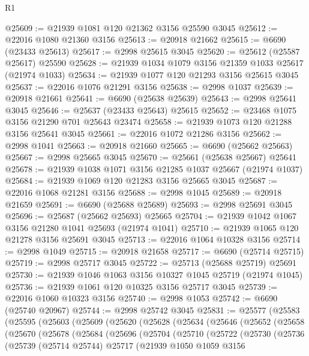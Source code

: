 \begin{lexlean}{R1}
\begin{coremodule}
@25609 := @21939 @1081 @120 @21362 @3156 @25590 @3045
@25612 := @22016 @1080 @21360 @3156
@25613 := @20918 @21662
@25615 := @6690 (@23433 @25613)
@25617 := @2998 @25615 @3045
@25620 := @25612 (@25587 @25617) @25590
@25628 := @21939 @1034 @1079 @3156 @21359 @1033 @25617 (@21974 @1033)
@25634 := @21939 @1077 @120 @21293 @3156 @25615 @3045
@25637 := @22016 @1076 @21291 @3156
@25638 := @2998 @1037
@25639 := @20918 @21661
@25641 := @6690 (@25638 @25639)
@25643 := @2998 @25641 @3045
@25646 := @25637 (@23433 @25643) @25615
@25652 := @23468 @1075 @3156 @21290 @701 @25643 @23474
@25658 := @21939 @1073 @120 @21288 @3156 @25641 @3045
@25661 := @22016 @1072 @21286 @3156
@25662 := @2998 @1041
@25663 := @20918 @21660
@25665 := @6690 (@25662 @25663)
@25667 := @2998 @25665 @3045
@25670 := @25661 (@25638 @25667) @25641
@25678 := @21939 @1038 @1071 @3156 @21285 @1037 @25667 (@21974 @1037)
@25684 := @21939 @1069 @120 @21283 @3156 @25665 @3045
@25687 := @22016 @1068 @21281 @3156
@25688 := @2998 @1045
@25689 := @20918 @21659
@25691 := @6690 (@25688 @25689)
@25693 := @2998 @25691 @3045
@25696 := @25687 (@25662 @25693) @25665
@25704 := @21939 @1042 @1067 @3156 @21280 @1041 @25693 (@21974 @1041)
@25710 := @21939 @1065 @120 @21278 @3156 @25691 @3045
@25713 := @22016 @1064 @10328 @3156
@25714 := @2998 @1049
@25715 := @20918 @21658
@25717 := @6690 (@25714 @25715)
@25719 := @2998 @25717 @3045
@25722 := @25713 (@25688 @25719) @25691
@25730 := @21939 @1046 @1063 @3156 @10327 @1045 @25719 (@21974 @1045)
@25736 := @21939 @1061 @120 @10325 @3156 @25717 @3045
@25739 := @22016 @1060 @10323 @3156
@25740 := @2998 @1053
@25742 := @6690 (@25740 @20967)
@25744 := @2998 @25742 @3045
@25831 := @25577
    (@25583
      (@25595
        (@25603
          (@25609
            (@25620
              (@25628
                (@25634
                  (@25646
                    (@25652
                      (@25658
                        (@25670
                          (@25678
                            (@25684
                              (@25696
                                (@25704
                                  (@25710
                                    (@25722
                                      (@25730
                                        (@25736
                                          (@25739
                                            (@25714 @25744)
                                            @25717
                                            (@21939
                                              @1050
                                              @1059
                                              @3156

\end{coremodule}
\end{lexlean}

